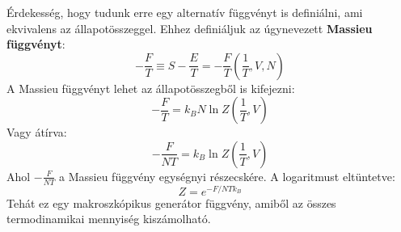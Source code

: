 \documentclass[../main.tex]{subfiles}
\begin{document}
Érdekesség, hogy tudunk erre egy alternatív függvényt is definiálni, ami ekvivalens az állapotösszeggel. Ehhez definiáljuk az úgynevezett \textbf{Massieu függvényt}:
\begin{equation}
    - \frac{F}{T} \equiv S - \frac{E}{T} = - \frac{F}{T}\left( \frac{1}{T}, V, N \right)
\end{equation}
A Massieu függvényt lehet az állapotösszegből is kifejezni:
\begin{equation}
    - \frac{F}{T} = k_B N \ln Z\left(\frac{1}{T}, V\right)
\end{equation}
Vagy átírva:
\begin{equation}
    - \frac{F}{NT} = k_B \ln Z\left(\frac{1}{T}, V\right)
\end{equation}
Ahol $- \frac{F}{N T}$ a Massieu függvény egységnyi részecskére. A logaritmust eltüntetve:
\begin{equation}
    Z = e^{-F/NT k_B}
\end{equation}
Tehát ez egy makroszkópikus generátor függvény, amiből az összes termodinamikai mennyiség kiszámolható.
\end{document}
